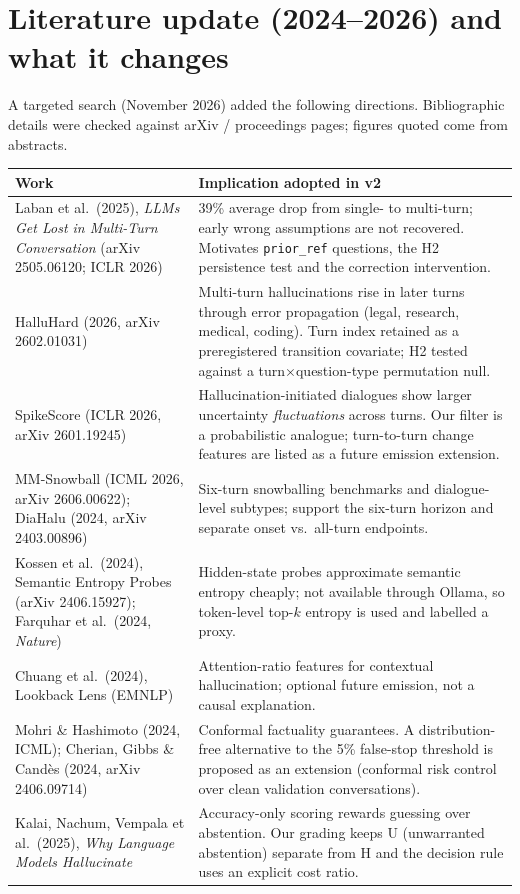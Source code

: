 \documentclass[11pt,letterpaper]{article}
\newcommand{\sectionpage}[1]{\clearpage\section{#1}}
\begin{document}
\sectionpage{Literature update (2024--2026) and what it changes}
A targeted search (November 2026) added the following directions. Bibliographic details were checked against arXiv / proceedings pages; figures quoted come from abstracts.

\begin{tabularx}{\linewidth}{p{.34\linewidth}X}
\toprule Work & Implication adopted in v2 \\ \midrule
Laban et al.\ (2025), \emph{LLMs Get Lost in Multi-Turn Conversation} (arXiv 2505.06120; ICLR 2026) & 39\% average drop from single- to multi-turn; early wrong assumptions are not recovered. Motivates \texttt{prior\_ref} questions, the H2 persistence test and the correction intervention. \\
HalluHard (2026, arXiv 2602.01031) & Multi-turn hallucinations rise in later turns through error propagation (legal, research, medical, coding). Turn index retained as a preregistered transition covariate; H2 tested against a turn$\times$question-type permutation null. \\
SpikeScore (ICLR 2026, arXiv 2601.19245) & Hallucination-initiated dialogues show larger uncertainty \emph{fluctuations} across turns. Our filter is a probabilistic analogue; turn-to-turn change features are listed as a future emission extension. \\
MM-Snowball (ICML 2026, arXiv 2606.00622); DiaHalu (2024, arXiv 2403.00896) & Six-turn snowballing benchmarks and dialogue-level subtypes; support the six-turn horizon and separate onset vs.\ all-turn endpoints. \\
Kossen et al.\ (2024), Semantic Entropy Probes (arXiv 2406.15927); Farquhar et al.\ (2024, \emph{Nature}) & Hidden-state probes approximate semantic entropy cheaply; not available through Ollama, so token-level top-$k$ entropy is used and labelled a proxy. \\
Chuang et al.\ (2024), Lookback Lens (EMNLP) & Attention-ratio features for contextual hallucination; optional future emission, not a causal explanation. \\
Mohri \& Hashimoto (2024, ICML); Cherian, Gibbs \& Cand\`es (2024, arXiv 2406.09714) & Conformal factuality guarantees. A distribution-free alternative to the 5\% false-stop threshold is proposed as an extension (conformal risk control over clean validation conversations). \\
Kalai, Nachum, Vempala et al.\ (2025), \emph{Why Language Models Hallucinate} & Accuracy-only scoring rewards guessing over abstention. Our grading keeps U (unwarranted abstention) separate from H and the decision rule uses an explicit cost ratio. \\

\end{tabularx}
\end{document}
